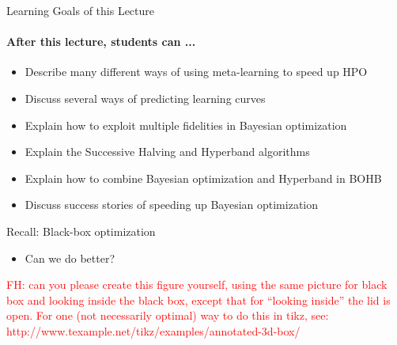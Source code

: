 
\begin{frame}[c]{Learning Goals of this Lecture}
\framesubtitle{After this lecture, students can ...}

\begin{itemize}
    \item Describe many different ways of using \alert{meta-learning} to speed up HPO
    \item Discuss several ways of predicting \alert{learning curves}
    \item Explain how to \alert{exploit multiple fidelities in Bayesian optimization} 
    \item Explain the \alert{Successive Halving} and \alert{Hyperband} algorithms 
    \item Explain how to combine Bayesian optimization and Hyperband in \alert{BOHB}
    \item Discuss \alert{success stories} of speeding up Bayesian optimization
\end{itemize}
\end{frame}












\iffalse


\begin{frame}{Recall: Black-box optimization}

\begin{figure}
    \centering
    
\end{figure}
\pause
\begin{itemize}
    \item Can we do better?
\end{itemize}
    
    \textcolor{red}{FH: can you please create this figure yourself, using the same picture for black box and looking inside the black box, except that for ``looking inside'' the lid is open. For one (not necessarily optimal) way to do this in tikz, see: http://www.texample.net/tikz/examples/annotated-3d-box/}
    
\end{frame}




